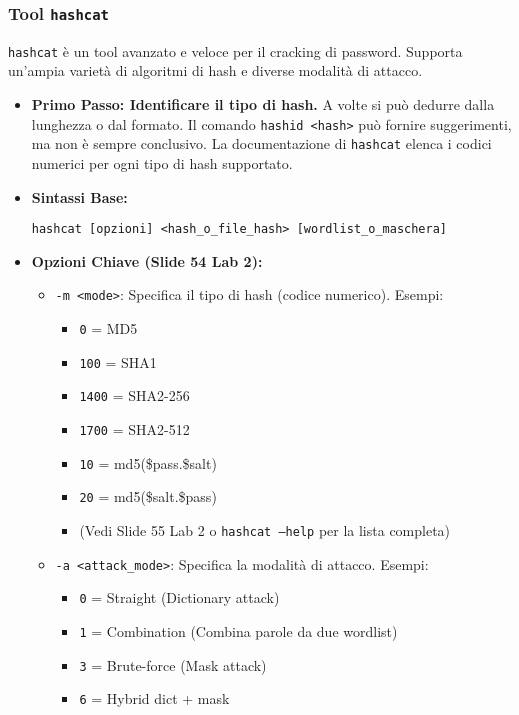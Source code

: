 \subsubsection{Tool \texttt{hashcat}}
\texttt{hashcat} è un tool avanzato e veloce per il cracking di password. Supporta un'ampia varietà di algoritmi di hash e diverse modalità di attacco.
\begin{itemize}
    \item \textbf{Primo Passo: Identificare il tipo di hash.} A volte si può dedurre dalla lunghezza o dal formato. Il comando \texttt{hashid <hash>} può fornire suggerimenti, ma non è sempre conclusivo. La documentazione di \texttt{hashcat} elenca i codici numerici per ogni tipo di hash supportato.
    \item \textbf{Sintassi Base:}
\begin{verbatim}
hashcat [opzioni] <hash_o_file_hash> [wordlist_o_maschera]
\end{verbatim}
    \item \textbf{Opzioni Chiave (Slide 54 Lab 2):}
    \begin{itemize}
        \item \texttt{-m <mode>}: Specifica il tipo di hash (codice numerico). Esempi:
        \begin{itemize}
            \item \texttt{0} = MD5
            \item \texttt{100} = SHA1
            \item \texttt{1400} = SHA2-256
            \item \texttt{1700} = SHA2-512
            \item \texttt{10} = md5(\$pass.\$salt)
            \item \texttt{20} = md5(\$salt.\$pass)
            \item (Vedi Slide 55 Lab 2 o \texttt{hashcat --help} per la lista completa)
        \end{itemize}
        \item \texttt{-a <attack\_mode>}: Specifica la modalità di attacco. Esempi:
        \begin{itemize}
            \item \texttt{0} = Straight (Dictionary attack)
            \item \texttt{1} = Combination (Combina parole da due wordlist)
            \item \texttt{3} = Brute-force (Mask attack)
            \item \texttt{6} = Hybrid dict + mask

\end{itemize}
\end{itemize}
\end{itemize}
